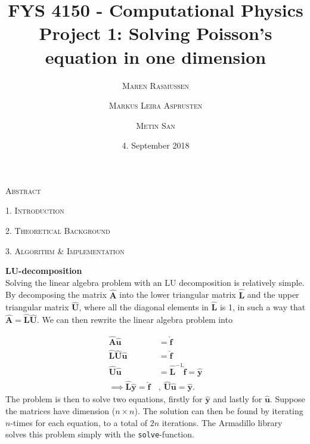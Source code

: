\documentclass[a4paper,10pt]{article}
\title{FYS 4150 - Computational Physics\\
 Project 1: Solving Poisson's equation in one dimension 
}
\date{\normalsize{4. September 2018} }
\author{
 \textsc{\small{Maren Rasmussen}}\and \textsc{\small{Markus Leira Asprusten}}\and \textsc{\small{Metin San}}
 }
\begin{document}
\maketitle
\begin{center}
\textsc{Abstract}
\end{center}

\begin{adjustwidth}{7mm}{7mm}


\end{adjustwidth}



\bigskip

\begin{center}
\textsc{1. Introduction}
\end{center}

\newpage


\begin{center}
\textsc{2. Theoretical Background}

\end{center}
\begin{center}
\textsc{3. Algorithm \& Implementation }
\end{center}
 \textbf{LU-decomposition} \\
Solving the linear algebra problem with an LU decomposition is relatively simple. By decomposing the matrix $\mathbf{\hat{A}}$ into the lower triangular matrix $\mathbf{\hat{L}}$ and the upper triangular matrix $\mathbf{\hat{U}}$, where all the diagonal elements in $\mathbf{\hat{L}}$ is 1, in such a way that $\mathbf{\hat{A}} = \mathbf{\hat{L}\hat{U}}$. We can then rewrite the linear algebra problem into

\begin{align}
	\mathbf{\hat{A}}\mathbf{\hat{u}} &= \mathbf{\hat{f}} \nonumber\\
	\mathbf{\hat{L}}\mathbf{\hat{U}}\mathbf{\hat{u}} &= \mathbf{\hat{f}} \nonumber\\
	\mathbf{\hat{U}}\mathbf{\hat{u}} &= \mathbf{\hat{L}}^{-1}\mathbf{\hat{f}} = \mathbf{\hat{y}} \nonumber\\
	\implies \mathbf{\hat{L}\hat{y}} = \mathbf{\hat{f}} \, &,\, \mathbf{\hat{U}\hat{u}} = \mathbf{\hat{y}}.
\end{align}
The problem is then to solve two equations, firstly for $\mathbf{\hat{y}}$ and lastly for $\mathbf{\hat{u}}$. Suppose the matrices have dimension ($n\times n$). The solution can then be found by iterating $n$-times for each equation, to a total of $2n$ iterations. The Armadillo library solves this problem simply with the \texttt{solve}-function.
\end{document}
